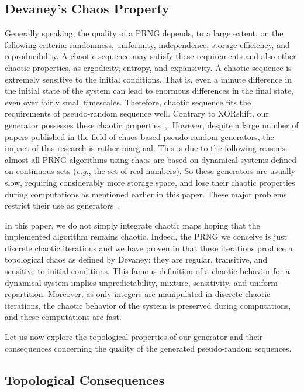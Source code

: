 \documentclass[journal]{IEEEtran}
\begin{document}
\subsection{Devaney's Chaos Property}

Generally speaking, the quality of a PRNG depends, to a large extent, on the following criteria: randomness, uniformity, independence, storage efficiency, and reproducibility. A chaotic sequence may satisfy these requirements and also other chaotic properties, as ergodicity, entropy, and expansivity. A chaotic sequence is extremely sensitive to the initial conditions. That is, even a minute difference in the initial state of the system can lead to enormous differences in the final state, even over fairly small timescales. Therefore, chaotic sequence fits the requirements of pseudo-random sequence well. Contrary to XORshift, our generator possesses these chaotic properties~\cite{guyeux09},\cite{wang2009}.
However, despite a large number of papers published in the field of chaos-based pseudo-random generators, the impact of this research is rather marginal. This is due to the following reasons: almost all PRNG algorithms using chaos are based on dynamical systems defined on continuous sets (\emph{e.g.}, the set of real numbers). So these generators are usually slow, requiring considerably more storage space, and lose their chaotic properties during computations as mentioned earlier in this paper. These major problems restrict their use as generators~\cite{Kocarev2001}.

In this paper, we do not simply integrate chaotic maps hoping that the implemented algorithm remains chaotic. Indeed, the PRNG we conceive is just discrete chaotic iterations and we have proven in \cite{guyeux09} that these iterations produce a topological chaos as defined by Devaney: they are regular, transitive, and sensitive to initial conditions. This famous definition of a chaotic behavior for a dynamical system implies unpredictability, mixture, sensitivity, and uniform repartition. Moreover, as only integers are manipulated in discrete chaotic iterations, the chaotic behavior of the system is preserved during computations, and these computations are fast.

Let us now explore the topological properties of our generator and their consequences concerning the quality of the generated pseudo-random sequences.



\subsection{Topological Consequences}
\end{document}
